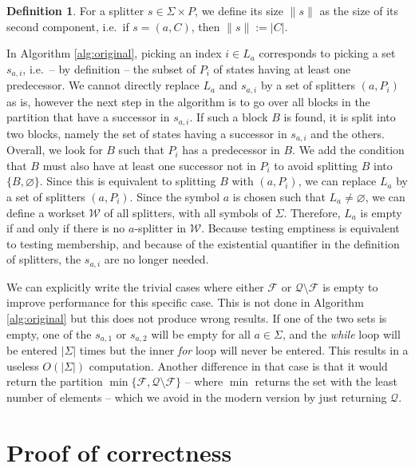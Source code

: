 \documentclass[12pt, a4 paper]{article}
\theoremstyle{definition}
\newtheorem{definition}{Definition}
\begin{document}
\begin{definition}
    For a splitter $s \in \Sigma \times P$, we define its size $\| s \|$ as the size of its second component, i.e.\ if $s = (a, C)$, then $\| s \| := |C|$.
\end{definition}


In Algorithm \ref{alg:original}, picking an index $i \in L_a$ corresponds to picking a set $s_{a, i}$, i.e.\ -- by definition -- the subset of $P_i$ of states having at least one predecessor. We cannot directly replace $L_a$ and $s_{a, i}$ by a set of splitters $(a, P_i)$ as is, however the next step in the algorithm is to go over all blocks in the partition that have a successor in $s_{a, i}$. If such a block $B$ is found, it is split into two blocks, namely the set of states having a successor in $s_{a, i}$ and the others. Overall, we look for $B$ such that $P_i$ has a predecessor in $B$. We add the condition that $B$ must also have at least one successor not in $P_i$ to avoid splitting $B$ into $\{B, \varnothing\}$. Since this is equivalent to splitting $B$ with $(a, P_i)$, we can replace $L_a$ by a set of splitters $(a, P_i)$. Since the symbol $a$ is chosen such that $L_a \neq \varnothing$, we can define a workset $\mathcal{W}$ of all splitters, with all symbols of $\Sigma$. Therefore, $L_a$ is empty if and only if there is no $a$-splitter in $\mathcal{W}$. Because testing emptiness is equivalent to testing membership, and because of the existential quantifier in the definition of splitters, the $s_{a, i}$ are no longer needed.

We can explicitly write the trivial cases where either $\mathcal{F}$ or $\mathcal{Q}\setminus\mathcal{F}$ is empty to improve performance for this specific case. This is not done in Algorithm \ref{alg:original} but this does not produce wrong results. If one of the two sets is empty, one of the $s_{a, 1}$ or $s_{a, 2}$ will be empty for all $a \in \Sigma$, and the \textit{while} loop will be entered $|\Sigma|$ times but the inner \textit{for} loop will never be entered. This results in a useless $O(|\Sigma|)$ computation. Another difference in that case is that it would return the partition $\min\{\mathcal{F}, \mathcal{Q}\setminus\mathcal{F}\}$ -- where $\min$ returns the set with the least number of elements --  which we avoid in the modern version by just returning $\mathcal{Q}$.

\section{Proof of correctness}
\end{document}
